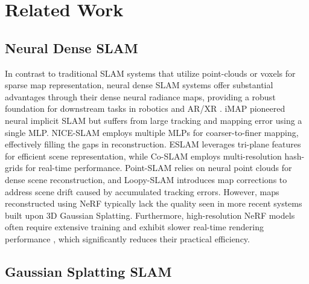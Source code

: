 \section{Related Work}
\subsection{Neural Dense SLAM}
In contrast to traditional SLAM systems \cite{mur2015orb,mur2017orb,zhang2019hierarchical,campos2021orb,du2022accurate,chung2023orbeez,pan2024robust} that utilize point-clouds or voxels for sparse map representation, neural dense SLAM systems \cite{yan2017dense,zhang2023go,li2023end,huang2023real,deng2024plgslam,zhu2024nicer,zhou2024mod,deng2024neslam,xie2025depth} offer substantial advantages through their dense neural radiance maps, providing a robust foundation for downstream tasks in robotics and AR/XR \cite{deng2023prosgnerf}. iMAP \cite{sucar2021imap} pioneered neural implicit SLAM but suffers from large tracking and mapping error using a single MLP. NICE-SLAM \cite{zhu2022nice} employs multiple MLPs for coarser-to-finer mapping, effectively filling the gaps in reconstruction. ESLAM \cite{johari2023eslam} leverages tri-plane features for efficient scene representation, while Co-SLAM \cite{wang2023co} employs multi-resolution hash-grids for real-time performance. Point-SLAM \cite{sandstrom2023point} relies on neural point clouds for dense scene reconstruction, and Loopy-SLAM \cite{liso2024loopy} introduces map corrections to address scene drift caused by accumulated tracking errors. However, maps reconstructed using NeRF typically lack the quality seen in more recent systems built upon 3D Gaussian Splatting. Furthermore, high-resolution NeRF models often require extensive training and exhibit slower real-time rendering performance \cite{kerbl20233d}, which significantly reduces their practical efficiency.

\subsection{Gaussian Splatting SLAM}

